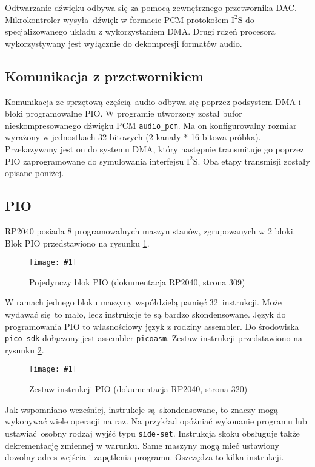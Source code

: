 \documentclass[polish]{aghengthesis}
\newcommand{\imgint}[4]{
	\begin{figure}[{#4}]
		\centering
		\texttt{[image: \#1]}
		\caption{#2}
		\label{#1}
	\end{figure}
}
\newcommand{\imgh}[3]{\imgint{#1}{#2}{#3}{H}}
\newcommand{\isqs}{$\text{I}^{2}\text{S}$}
\newcommand{\sset}{\lstinline|side-set|}
\begin{document}
		
			
		Odtwarzanie dźwięku odbywa się za pomocą zewnętrznego przetwornika DAC. Mikrokontroler wysyła dźwięk w formacie PCM protokołem \isqs{} do specjalizowanego układu z wykorzystaniem DMA. Drugi rdzeń procesora wykorzystywany jest wyłącznie do dekompresji formatów audio.
		
		
		\subsection{Komunikacja z przetwornikiem}
			Komunikacja ze sprzętową częścią audio odbywa się poprzez podsystem DMA i bloki programowalne PIO.
			W programie utworzony został bufor nieskompresowanego dźwięku PCM \lstinline|audio_pcm|. Ma on konfigurowalny rozmiar wyrażony w jednostkach 32-bitowych (2 kanały * 16-bitowa próbka). Przekazywany jest on do systemu DMA, który następnie transmituje go poprzez PIO zaprogramowane do symulowania interfejsu \isqs{}. Oba etapy transmisji zostały opisane poniżej.
		
		\subsection{PIO}
			RP2040 posiada 8 programowalnych maszyn stanów, zgrupowanych w 2 bloki.
			Blok PIO przedstawiono na rysunku \ref{3/pio_block}.
			\imgh{3/pio_block}{Pojedynczy blok PIO (dokumentacja RP2040\textsuperscript{\cite{pico_pdf}}, strona 309)}{0.7}
			
			W ramach jednego bloku maszyny współdzielą pamięć 32 instrukcji. Może wydawać się to mało, lecz instrukcje te są bardzo skondensowane. Język do programowania PIO to własnościowy język z rodziny assembler. Do środowiska \lstinline|pico-sdk| dołączony jest assembler \lstinline|picoasm|. Zestaw instrukcji przedstawiono na rysunku \ref{3/pio_instr}.
			\imgh{3/pio_instr}{Zestaw instrukcji PIO (dokumentacja RP2040, strona 320)}{0.7}
			
			Jak wspomniano wcześniej, instrukcje są skondensowane, to znaczy mogą wykonywać wiele operacji na raz. Na przykład opóźniać wykonanie programu lub ustawiać osobny rodzaj wyjść typu \sset{}.
			Instrukcja skoku obsługuje także dekrementację zmiennej w warunku. Same maszyny mogą mieć ustawiony dowolny adres wejścia i zapętlenia programu. Oszczędza to kilka instrukcji.
			
\end{document}
